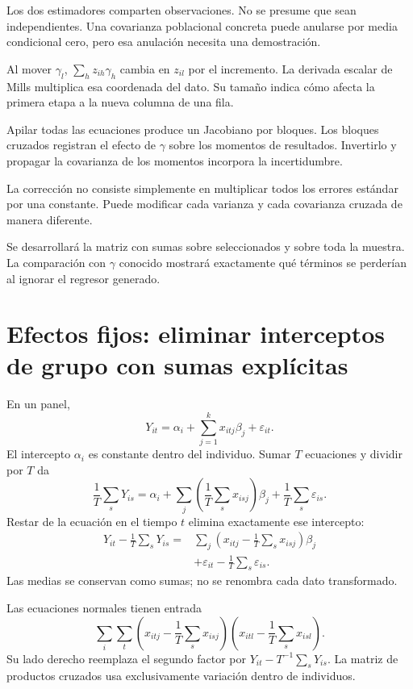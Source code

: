 \documentclass[11pt,a4paper]{article}
\begin{document}
Los dos estimadores comparten observaciones.
No se presume que sean independientes.
Una covarianza poblacional concreta puede
anularse por media condicional cero,
pero esa anulación necesita una demostración.

\begin{ejemplo}
Al mover \(\gamma_l\),
\(\sum_h z_{ih}\gamma_h\) cambia en \(z_{il}\)
por el incremento.
La derivada escalar de Mills multiplica
esa coordenada del dato.
Su tamaño indica cómo afecta la primera etapa
a la nueva columna de una fila.
\end{ejemplo}
Apilar todas las ecuaciones produce un
Jacobiano por bloques. Los bloques cruzados
registran el efecto de \(\gamma\) sobre
los momentos de resultados.
Invertirlo y propagar la covarianza de
los momentos incorpora la incertidumbre.

La corrección no consiste simplemente en
multiplicar todos los errores estándar
por una constante.
Puede modificar cada varianza y cada
covarianza cruzada de manera diferente.

Se desarrollará la matriz con sumas
sobre seleccionados y sobre toda la muestra.
La comparación con \(\gamma\) conocido
mostrará exactamente qué términos
se perderían al ignorar el regresor generado.

\clearpage
\section{Efectos fijos: eliminar interceptos de grupo con sumas explícitas}\label{unidad18}
En un panel,
\[
Y_{it}=\alpha_i+\sum_{j=1}^k x_{itj}\beta_j+\varepsilon_{it}.
\]
El intercepto \(\alpha_i\) es constante dentro del individuo.
Sumar \(T\) ecuaciones y dividir por \(T\) da
\[
\frac1T\sum_sY_{is}
=\alpha_i+\sum_j\left(\frac1T\sum_sx_{isj}\right)\beta_j
+\frac1T\sum_s\varepsilon_{is}.
\]
Restar de la ecuación en el tiempo \(t\) elimina
exactamente ese intercepto:
\[
\begin{aligned}
Y_{it}-\frac1T\sum_sY_{is}
={}&\sum_j\left(x_{itj}-\frac1T\sum_sx_{isj}\right)\beta_j\\
&+\varepsilon_{it}-\frac1T\sum_s\varepsilon_{is}.
\end{aligned}
\]
Las medias se conservan como sumas;
no se renombra cada dato transformado.

Las ecuaciones normales tienen entrada
\[
\sum_i\sum_t
\left(x_{itj}-\frac1T\sum_sx_{isj}\right)
\left(x_{itl}-\frac1T\sum_sx_{isl}\right).
\]
Su lado derecho reemplaza el segundo factor
por \(Y_{it}-T^{-1}\sum_sY_{is}\).
La matriz de productos cruzados usa
exclusivamente variación dentro de individuos.
\end{document}
